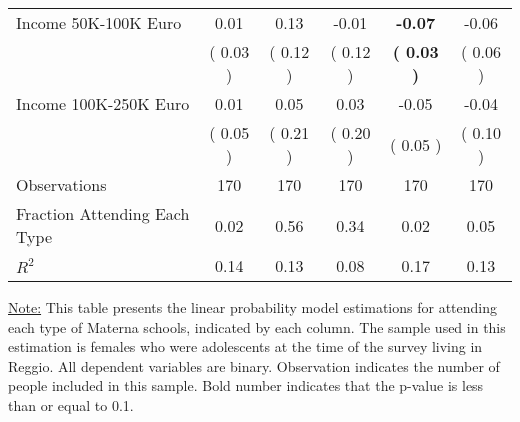 \begin{table}[H]
{\begin{tabular}{lccccc}
\quad Income 50K-100K Euro &      0.01 &      0.13 &     -0.01 & \textbf{    -0.07} &     -0.06 \\
\quad  & (     0.03 ) & (     0.12 )  & (     0.12 )  & \textbf{(     0.03 )} & (     0.06 ) \\
\quad Income 100K-250K Euro &      0.01 &      0.05 &      0.03 &     -0.05 &     -0.04 \\
\quad  & (     0.05 ) & (     0.21 )  & (     0.20 )  & (     0.05 ) & (     0.10 ) \\
\midrule
Observations & 170 & 170 & 170 & 170 & 170 \\
Fraction Attending Each Type &      0.02 &      0.56 &      0.34 &      0.02 &      0.05 \\
\midrule
$ R^2$ &      0.14 &      0.13 &      0.08 &      0.17 &      0.13 \\
\bottomrule
\end{tabular}}
\end{table}
\begin{footnotesize}
\noindent\underline{Note:} This table presents the linear probability model estimations for attending each type of Materna schools, indicated by each column. The sample used in this estimation is females who were adolescents at the time of the survey living in Reggio. All dependent variables are binary. Observation indicates the number of people included in this sample. Bold number indicates that the p-value is less than or equal to 0.1.
\end{footnotesize}
